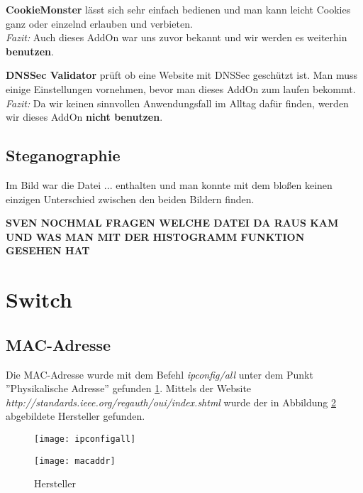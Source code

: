 \documentclass{scrartcl}
\begin{document}
  \textbf{CookieMonster} lässt sich sehr einfach bedienen und man kann leicht Cookies ganz oder einzelnd erlauben und verbieten.\\
  \emph{Fazit:} Auch dieses AddOn war uns zuvor bekannt und wir werden es weiterhin \textbf{benutzen}.
  
  \textbf{DNSSec Validator} prüft ob eine Website mit DNSSec geschützt ist. Man muss einige Einstellungen vornehmen, bevor man dieses AddOn zum laufen bekommt.\\
  \emph{Fazit:} Da wir keinen sinnvollen Anwendungsfall im Alltag dafür finden, werden wir dieses AddOn \textbf{nicht benutzen}.
  
  
  \subsection[Aufgabe 12 Steganographie]{Steganographie}
  
  Im Bild war die Datei ... enthalten und man konnte mit dem bloßen keinen einzigen Unterschied zwischen den beiden Bildern finden.
  
  \textbf{SVEN NOCHMAL FRAGEN WELCHE DATEI DA RAUS KAM UND WAS MAN MIT DER HISTOGRAMM FUNKTION GESEHEN HAT}
       
  \newpage
\section[Versuch 4 Switch]{Switch}

  \subsection[Aufgabe 3 MAC-Adresse]{MAC-Adresse}
  
  Die MAC-Adresse wurde mit dem Befehl \textit{ipconfig/all} unter dem Punkt ''Physikalische Adresse'' gefunden \ref{fig:ipconfigall}. Mittels der Website \\ 
  \emph{\textit{ http://standards.ieee.org/regauth/oui/index.shtml}} wurde der in Abbildung \ref{fig:macaddr} abgebildete Hersteller gefunden.  

  \begin{figure}
    \texttt{[image: ipconfigall]}
    \label{fig:ipconfigall}
  \end{figure}
     
  
  \begin{figure}
    \texttt{[image: macaddr]}
    \caption{Hersteller}
    \label{fig:macaddr}
  \end{figure}
  
\end{document}
